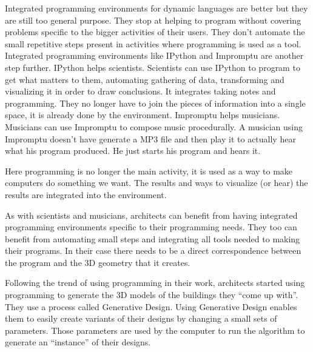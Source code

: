 \documentclass{./llncs2e/llncs}
\begin{document}
	Integrated programming environments for dynamic languages are better but they are still too general purpose.
	They stop at helping to program without covering problems specific to the bigger activities of their users.
	They don't automate the small repetitive steps present in activities where programming is used as a tool.
	Integrated programming environments like IPython and Impromptu are another step further.
	IPython helps scientists.
	Scientists can use IPython to program to get what matters to them, automating gathering of data, transforming and visualizing it in order to draw conclusions.
	It integrates taking notes and programming.
	They no longer have to join the pieces of information into a single space, it is already done by the environment.
	Impromptu helps musicians.
	Musicians can use Impromptu to compose music procedurally.
	A musician using Impromptu doesn't have generate a MP3 file and then play it to actually hear what his program produced.
	He just starts his program and hears it.

	Here programming is no longer the main activity, it is used as a way to make computers do something we want.
	The results and ways to visualize (or hear) the results are integrated into the environment.

	As with scientists and musicians, architects can benefit from having integrated programming environments specific to their programming needs.
	They too can benefit from automating small steps and integrating all tools needed to making their programs.
	In their case there needs to be a direct correspondence between the program and the 3D geometry that it creates.
	
	Following the trend of using programming in their work, architects started using programming to generate the 3D models of the buildings they ``come up with''. 
	They use a process called Generative Design\cite{terzidis2003expressive}\cite{Maeda:2001:DN:559503}.
	Using Generative Design enables them to easily create variants of their designs by changing a small sets of parameters. 
	Those parameters are used by the computer to run the algorithm to generate an ``instance'' of their designs. \cite{Santos20144}
\end{document}

